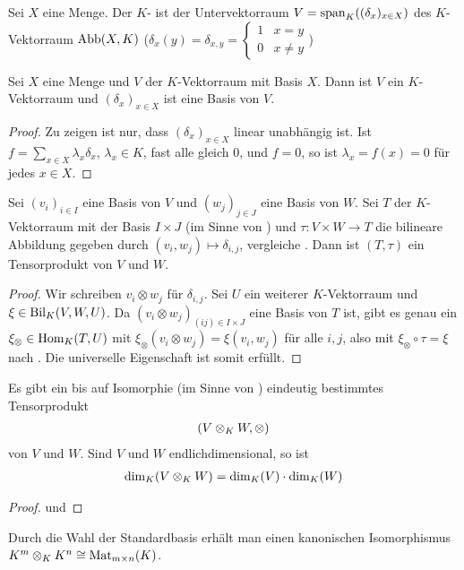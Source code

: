 \begin{definition}
	Sei $X$ eine Menge. Der $K$- ist der Untervektorraum $V=\operatorname{span}_K((\delta_x)_{x\in X})$ des $K$-Vektorraum $\operatorname{Abb}(X,K)$ ($\delta_x(y)=\delta_{x,y}=\begin{cases}1&x=y\\0&x\neq y\end{cases}$)
\end{definition}

\begin{lemma}
	Sei $X$ eine Menge und $V$ der $K$-Vektorraum mit Basis $X$. Dann ist $V$ ein $K$-Vektorraum und $(\delta_x)_{x\in X}$ ist eine Basis von $V$.
\end{lemma}
\begin{proof}
	Zu zeigen ist nur, dass $(\delta_x)_{x\in X}$ linear unabhängig ist. Ist $f=\sum_{x\in X}\lambda_x \delta_x$, $\lambda_x\in K$, fast alle gleich 0, und $f=0$, so ist $\lambda_x=f(x)=0$ für jedes $x\in X$. 
\end{proof}

\begin{lemma}
	Sei $(v_i)_{i\in I}$ eine Basis von $V$ und $(w_j)_{j\in J}$ eine Basis von $W$. Sei $T$ der $K$-Vektorraum mit der Basis $I\times J$ (im Sinne von ) und $\tau:V\times W\to T$ die bilineare Abbildung gegeben durch $(v_i,w_j)\mapsto \delta_{i,j}$, vergleiche . Dann ist $(T,\tau)$ ein Tensorprodukt von $V$ und $W$.
\end{lemma}
\begin{proof}
	Wir schreiben $v_i\otimes w_j$ für $\delta_{i,j}$. Sei $U$ ein weiterer $K$-Vektorraum und $\xi\in\operatorname{Bil}_K(V,W,U)$. Da $(v_i\otimes w_j)_{(ij)\in I\times J}$ eine Basis von $T$ ist, gibt es genau ein $\xi_\otimes\in\operatorname{Hom}_K(T,U)$ mit $\xi_\otimes(v_i\otimes w_j)=\xi(v_i,w_j)$ für alle $i,j$, also mit $\xi_\otimes\circ\tau=\xi$ nach . Die universelle Eigenschaft ist somit erfüllt.
\end{proof}

\begin{proposition}
	Es gibt ein bis auf Isomorphie (im Sinne von ) eindeutig bestimmtes Tensorprodukt
	\begin{align}
		(V\otimes_K W,\otimes)\notag
	\end{align}
	von $V$ und $W$. Sind $V$ und $W$ endlichdimensional, so ist
	\begin{align}
		\dim_K(V\otimes_K W)=\dim_K(V)\cdot\dim_K(W)\notag
	\end{align}
\end{proposition}
\begin{proof}
	 und 
\end{proof}

\begin{example}
	Durch die Wahl der Standardbasis erhält man einen kanonischen Isomorphismus $K^m\otimes_K K^n\cong\operatorname{Mat}_{m\times n}(K)$.
\end{example}